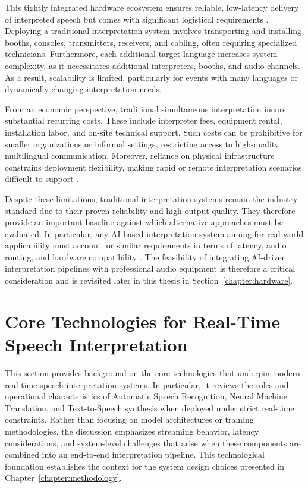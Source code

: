 
This tightly integrated hardware ecosystem ensures reliable, low-latency delivery of interpreted speech but comes with significant logistical requirements \cite{ozkaya2023transformative}. Deploying a traditional interpretation system involves transporting and installing booths, consoles, transmitters, receivers, and cabling, often requiring specialized technicians. Furthermore, each additional target language increases system complexity, as it necessitates additional interpreters, booths, and audio channels. As a result, scalability is limited, particularly for events with many languages or dynamically changing interpretation needs.

From an economic perspective, traditional simultaneous interpretation incurs substantial recurring costs. These include interpreter fees, equipment rental, installation labor, and on-site technical support. Such costs can be prohibitive for smaller organizations or informal settings, restricting access to high-quality multilingual communication. Moreover, reliance on physical infrastructure constrains deployment flexibility, making rapid or remote interpretation scenarios difficult to support \cite{rayaa2022remoteSI}.

Despite these limitations, traditional interpretation systems remain the industry standard due to their proven reliability and high output quality. They therefore provide an important baseline against which alternative approaches must be evaluated. In particular, any AI-based interpretation system aiming for real-world applicability must account for similar requirements in terms of latency, audio routing, and hardware compatibility \cite{dhawan2022speech2speechchallenges}. The feasibility of integrating AI-driven interpretation pipelines with professional audio equipment is therefore a critical consideration and is revisited later in this thesis in Section~\ref{chapter:hardware}.


\section{Core Technologies for Real-Time Speech Interpretation}

This section provides background on the core technologies that underpin modern real-time speech interpretation systems. In particular, it reviews the roles and operational characteristics of Automatic Speech Recognition, Neural Machine Translation, and Text-to-Speech synthesis when deployed under strict real-time constraints. Rather than focusing on model architectures or training methodologies, the discussion emphasizes streaming behavior, latency considerations, and system-level challenges that arise when these components are combined into an end-to-end interpretation pipeline. This technological foundation establishes the context for the system design choices presented in Chapter~\ref{chapter:methodology}.

